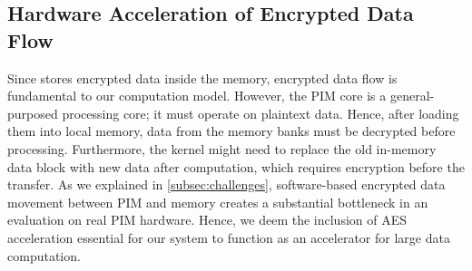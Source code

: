 



\subsection{Hardware Acceleration of Encrypted Data Flow }
\label{subsec:performance}
\label{subsec:aes-dma}
\label{subsec:upmem-aes}


Since \thename stores encrypted data inside the memory, encrypted data flow is fundamental to our computation model. However, the PIM core is a general-purposed processing core; it must operate on plaintext data. Hence, after loading them into local memory, data from the memory banks must be decrypted before processing. Furthermore, the \thename kernel might need to replace the old in-memory data block with new data after computation, which requires encryption before the transfer. As we explained in \cref{subsec:challenges}, software-based encrypted data movement between PIM and memory creates a substantial bottleneck in an evaluation on real PIM hardware. Hence, we deem the inclusion of AES acceleration essential for our system to function as an accelerator for large data computation.


